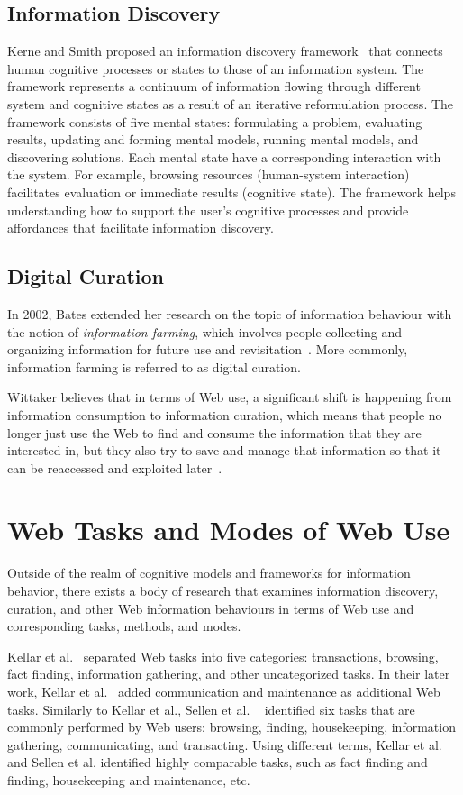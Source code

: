 {{\subsection{Information Discovery}
Kerne and Smith proposed an information discovery framework~\cite{kerne2004information} that connects human cognitive processes or states to those of an information system. The framework represents a continuum of information flowing through different system and cognitive states as a result of an iterative reformulation process. The framework consists of five mental states: formulating a problem, evaluating results, updating and forming mental models, running mental models, and discovering solutions. Each mental state have a corresponding interaction with the system. For example, browsing resources (human-system interaction) facilitates evaluation or immediate results (cognitive state). The framework helps understanding how to support the user's cognitive processes and provide affordances that facilitate information discovery.
}
   
{\subsection{Digital Curation}
In 2002, Bates extended her research on the topic of information behaviour with the notion of \textit{information farming}, which involves people collecting and organizing information for future use and revisitation~\cite{bates2002toward}. More commonly, information farming is referred to as digital curation. 

Wittaker believes that in terms of Web use, a significant shift is happening from information consumption to information curation, which means that people no longer just use the Web to find and consume the information that they are interested in, but they also try to save and manage that information so that it can be reaccessed and exploited later~\cite{whittaker2011personal}. 

{\section{Web Tasks and Modes of Web Use}
Outside of the realm of cognitive models and frameworks for information behavior, there exists a body of research that examines information discovery, curation, and other Web information behaviours in terms of Web use and corresponding tasks, methods, and modes.

Kellar et al.~\cite{kellar2006goal} separated Web tasks into five categories: transactions, browsing, fact finding, information gathering, and other uncategorized tasks. In their later work, Kellar et al.~\cite{kellar2007field} added communication and maintenance as additional Web tasks. Similarly to Kellar et al., Sellen et al. ~\cite{sellen2002knowledge} identified six tasks that are commonly performed by Web users: browsing, finding, housekeeping, information gathering, communicating, and transacting. Using different terms, Kellar et al. and Sellen et al. identified highly comparable tasks, such as fact finding and finding, housekeeping and maintenance, etc. 

}}}
